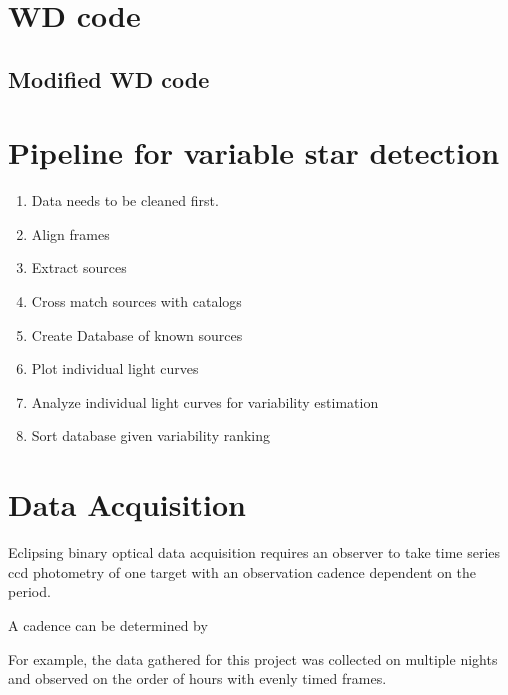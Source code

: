 \section{WD code}
\subsection{Modified WD code}

\section{Pipeline for variable star detection}
\begin{enumerate}
    \item Data needs to be cleaned first.
    \item Align frames
    \item Extract sources
    \item Cross match sources with catalogs
    \item Create Database of known sources
    \item Plot individual light curves
    \item Analyze individual light curves for variability estimation
    \item Sort database given variability ranking
\end{enumerate}




\section{Data Acquisition}
Eclipsing binary optical data acquisition requires an observer to take time series ccd photometry of one target with an observation cadence dependent on the period.

A cadence can be determined by 

For example, the data gathered for this project was collected on multiple nights and observed on the order of hours with evenly timed frames.

